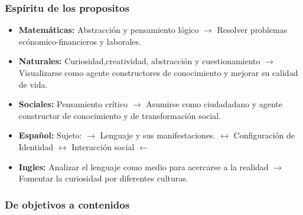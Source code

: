 \documentclass{beamer}
\begin{document}
\begin{frame}
\frametitle{Esp\'iritu de los propositos}
\begin{itemize}
\item \textbf{Matem\'aticas:} Abstracci\'on y pensamiento l\'ogico $\rightarrow$ Resolver problemas ec\'onomico-financieros y laborales. 
\item \textbf{Naturales: } Curiosidad,creatividad, abstracci\'on y cuestionamiento $\rightarrow$  Visualizarse como agente constructores de conocimiento y mejorar su calidad de vida. 
\item \textbf{Sociales:} Pensamiento cr\'itico $\rightarrow$ Asumirse como ciudadadano y agente constructor de conocimiento y de transformaci\'on social. 
\item \textbf{ Espa\~nol:} Sujeto: $\rightarrow $  Lenguaje y sus manifestaciones. $\leftrightarrow$ Configuraci\'on de Identidad $\leftrightarrow$  Interacci\'on social $\leftarrow$
\item \textbf{Ingles: } Analizar el lenguaje como medio para acercarse a la realidad $\rightarrow$  Fomentar la curiosidad por diferentes culturas. 
\end{itemize}
\end{frame}
\begin{frame}
\frametitle{De objetivos a contenidos}
\begin{center}
\end{center}
\end{frame}
\end{document}
